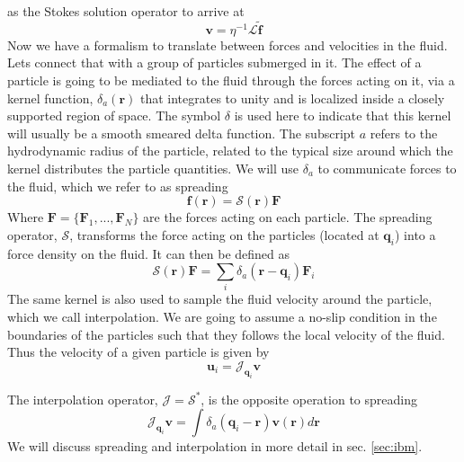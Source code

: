 \documentclass[ twoside,openright,titlepage,numbers=noenddot,%
headinclude,footinclude,cleardoublepage=empty,abstract=on,
BCOR=5mm,paper=a4,fontsize=11pt, dvipsnames
]{scrreprt}
\renewcommand{\vec}[1]{\bm{#1}}
\newcommand{\oper}[1]{\mathcal{#1}}
\newcommand{\ppos}{q}
\newcommand{\pvel}{u}
\newcommand{\fpos}{r}
\newcommand{\fvel}{v}
\begin{document}
as the Stokes solution operator to arrive at
\begin{equation}
  \vec{\fvel} = \eta^{-1}\oper{L}\tilde{\vec{f}}
\end{equation}
Now we have a formalism to translate between forces and velocities in the fluid. Lets connect that with a group of particles submerged in it.
The effect of a particle is going to be mediated to the fluid through the forces acting on it, via a kernel function, $\delta_a(\vec{r})$ that integrates to unity and is localized inside a closely supported region of space. The symbol $\delta$ is used here to indicate that this kernel will usually be a smooth smeared delta function. The subscript $a$ refers to the hydrodynamic radius of the particle, related to the typical size around which the kernel distributes the particle quantities. We will use $\delta_a$ to communicate forces to the fluid, which we refer to as spreading
\begin{equation}
  \vec{f}(\vec{\fpos}) = \oper{S}(\vec{\fpos})\vec{F}
\end{equation}
Where $\vec{F} =\{\vec{F}_1,...,\vec{F}_N\}$ are the forces acting on each particle.
The spreading operator, $\oper{S}$, transforms the force acting on the particles (located at $\vec{\ppos}_i$) into a force density on the fluid. It can then be defined as
\begin{equation}
    \label{eq:spreadoper}
  \oper{S}(\vec{\fpos})\vec{F} = \sum_i\delta_a(\vec{\fpos}-\vec{\ppos}_i)\vec{F}_i
\end{equation}
The same kernel is also used to sample the fluid velocity around the particle, which we call interpolation. We are going to assume a no-slip condition in the boundaries of the particles such that they follows the local velocity of the fluid. Thus the velocity of a given particle is given by
\begin{equation}
  \label{eq:bdhifvel}
  \vec{\pvel}_i= \oper{J}_{\vec{\ppos}_i}\vec{\fvel}
\end{equation}
  
The interpolation operator, $\oper{J}=\oper{S}^*$, is the opposite operation to spreading
\begin{equation}
  \label{eq:interpoper}
  \oper{J}_{\vec{\ppos}_i}\vec{\fvel} = \int{\delta_a(\vec{\ppos}_i - \vec{\fpos})\vec{\fvel}(\vec{\fpos})d\vec{\fpos}}
\end{equation}
We will discuss spreading and interpolation in more detail in sec. \ref{sec:ibm}.
\end{document}
